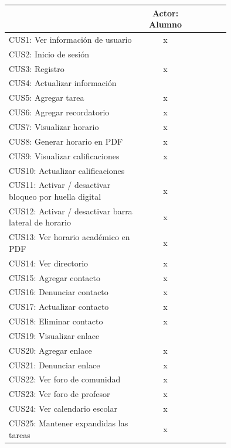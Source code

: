 \documentclass[10pt]{article}
\begin{document}
\begin{table}[ht]
\begin{center}
\begin{tabular}{|p{0.6\linewidth}|c |p{0.15\linewidth}|}
\hline                                                   & Actor: Alumno \\ \hline
{CUS1: Ver información de usuario}                       &  x \\ \hline
{CUS2: Inicio de sesión}                                 &    \\ \hline
{CUS3: Registro}                                         &  x \\ \hline
{CUS4: Actualizar información}                           &    \\ \hline
{CUS5: Agregar tarea}                                    &  x \\ \hline
{CUS6: Agregar recordatorio}                             &  x \\ \hline
{CUS7: Visualizar horario}                               &  x \\ \hline
{CUS8: Generar horario en PDF}                           &  x \\ \hline
{CUS9: Visualizar calificaciones}                        &  x \\ \hline
{CUS10: Actualizar calificaciones}                       &    \\ \hline
{CUS11: Activar / desactivar bloqueo por huella digital} &  x \\ \hline
{CUS12: Activar / desactivar barra lateral de horario}   &  x \\ \hline
{CUS13: Ver horario académico en PDF}                    &  x \\ \hline
{CUS14: Ver directorio}                                  &  x \\ \hline
{CUS15: Agregar contacto}                                &  x \\ \hline
{CUS16:  Denunciar contacto}                             &  x \\ \hline
{CUS17: Actualizar contacto}                             &  x \\ \hline
{CUS18: Eliminar contacto}                               &  x \\ \hline
{CUS19: Visualizar enlace}                               &    \\ \hline
{CUS20: Agregar enlace}                                  &  x \\ \hline
{CUS21: Denunciar enlace}                                &  x \\ \hline
{CUS22: Ver foro de comunidad}                           &  x \\ \hline
{CUS23: Ver foro de profesor}                            &  x \\ \hline
{CUS24: Ver calendario escolar}                          &  x \\ \hline
{CUS25: Mantener expandidas las tareas}                  &  x \\
\hline 
\end{tabular}
\end{center}
\end{table}
\end{document}

